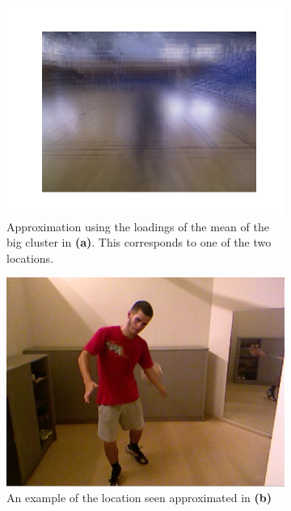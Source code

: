 \begin{figure}
\begin{subfigure}{.45\linewidth}
    \end{subfigure}
    \begin{subfigure}{.45\linewidth}
        \centering
        \captionsetup{width=.95\linewidth}
        \includegraphics[width=\linewidth]{Pics/06_results/loc2.png}
        \caption{Approximation using the loadings of the mean of the big cluster in \textbf{(a)}. This corresponds to one of the two locations.}
    \end{subfigure}
    \begin{subfigure}{.45\linewidth}
        \centering
        \captionsetup{width=.95\linewidth}
        \includegraphics[width=.78\linewidth]{Pics/06_results/loc_1_real.png}
        \caption{An example of the location seen approximated in \textbf{(b)}}
    \end{subfigure}
    \begin{subfigure}{.45\linewidth}
        \centering

\end{subfigure}
\end{figure}
